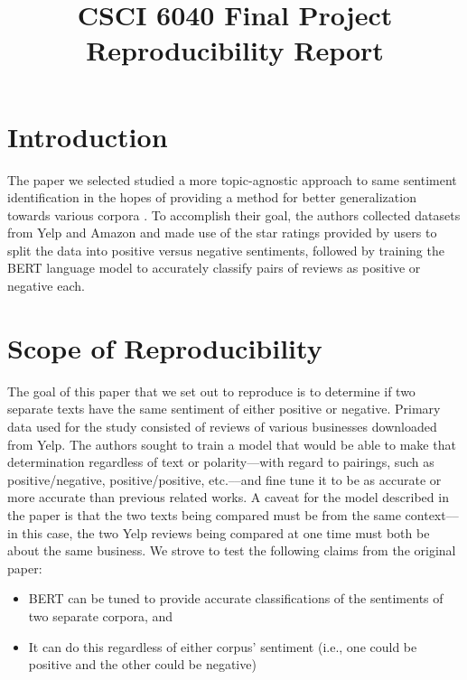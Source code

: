 \documentclass[conference]{IEEEtran}
\begin{document}
\title{CSCI 6040 Final Project\\Reproducibility Report}

\author{
\and
{}
\and
{}
}

\maketitle

\section{Introduction}
	The paper we selected studied a more topic-agnostic approach to same sentiment identification in the hopes of providing a method for better generalization towards various corpora \cite{korner-etal-2021-casting-sentiment}. To accomplish their goal, the authors collected datasets from Yelp and Amazon and made use of the star ratings provided by users to split the data into positive versus negative sentiments, followed by training the BERT language model to accurately classify pairs of reviews as positive or negative each.
	
\section{Scope of Reproducibility}
	The goal of this paper that we set out to reproduce is to determine if two separate texts have the same sentiment of either positive or negative. Primary data used for the study consisted of reviews of various businesses downloaded from Yelp. The authors sought to train a model that would be able to make that determination regardless of text or polarity---with regard to pairings, such as positive/negative, positive/positive, etc.--–and fine tune it to be as accurate or more accurate than previous related works. A caveat for the model described in the paper is that the two texts being compared must be from the same context–--in this case, the two Yelp reviews being compared at one time must both be about the same business.
	We strove to test the following claims from the original paper:
\begin{itemize}
	\item{BERT can be tuned to provide accurate classifications of the sentiments of two separate corpora, and}
	\item{It can do this regardless of either corpus’ sentiment (i.e., one could be positive and the other could be negative)}
\end{itemize}
\end{document}
